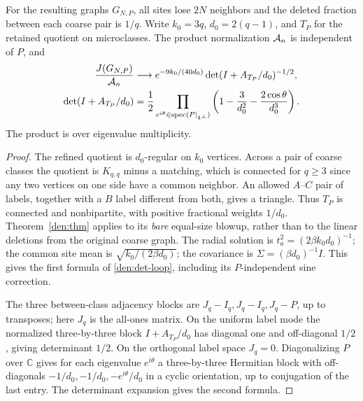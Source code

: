 \begin{proposition}\label{den:loop}
For the resulting graphs \(G_{N,P}\), all sites lose \(2N\) neighbors and the deleted fraction between each coarse pair is \(1/q\). Write \(k_0=3q\), \(d_0=2(q-1)\), and \(T_P\) for the retained quotient on microclasses. The product normalization \({\cal A}_n\) is independent of \(P\), and
\begin{equation}\label{den:det-loop}
 \begin{aligned}
 \frac{J(G_{N,P})}{{\cal A}_n}
 &\longrightarrow e^{-9k_0/(40d_0)}\det(I+A_{T_P}/d_0)^{-1/2},\\
 \det(I+A_{T_P}/d_0)
 &=\frac12\prod_{e^{i\theta}\in\operatorname{spec}(P|_{\mathbf1^\perp})}
              \left(1-\frac3{d_0^2}-\frac{2\cos\theta}{d_0^3}\right).
 \end{aligned}
\end{equation}
The product is over eigenvalue multiplicity.
\end{proposition}

\begin{proof}
The refined quotient is \(d_0\)-regular on \(k_0\) vertices. Across a pair of coarse classes the quotient is \(K_{q,q}\) minus a matching, which is connected for \(q\ge3\) since any two vertices on one side have a common neighbor. An allowed \(A\)--\(C\) pair of labels, together with a \(B\) label different from both, gives a triangle. Thus \(T_P\) is connected and nonbipartite, with positive fractional weights \(1/d_0\). Theorem~\ref{den:thm} applies to its \emph{bare} equal-size blowup, rather than to the linear deletions from the original coarse graph. The radial solution is \(t_a^2=(2\beta k_0 d_0)^{-1}\); the common site mean is \(\sqrt{k_0/(2\beta d_0)}\); the covariance is \(\Sigma=(\beta d_0)^{-1}I\). This gives the first formula of \eqref{den:det-loop}, including its \(P\)-independent sine correction.

The three between-class adjacency blocks are \(J_q-I_q,J_q-I_q,J_q-P\), up to transposes; here \(J_q\) is the all-ones matrix. On the uniform label mode the normalized three-by-three block \(I+A_{T_P}/d_0\) has diagonal one and off-diagonal \(1/2\), giving determinant \(1/2\). On the orthogonal label space \(J_q=0\). Diagonalizing \(P\) over \(\mathbb C\) gives for each eigenvalue \(e^{i\theta}\) a three-by-three Hermitian block with off-diagonals \(-1/d_0,-1/d_0,-e^{i\theta}/d_0\) in a cyclic orientation, up to conjugation of the last entry. The determinant expansion gives the second formula.
\end{proof}

